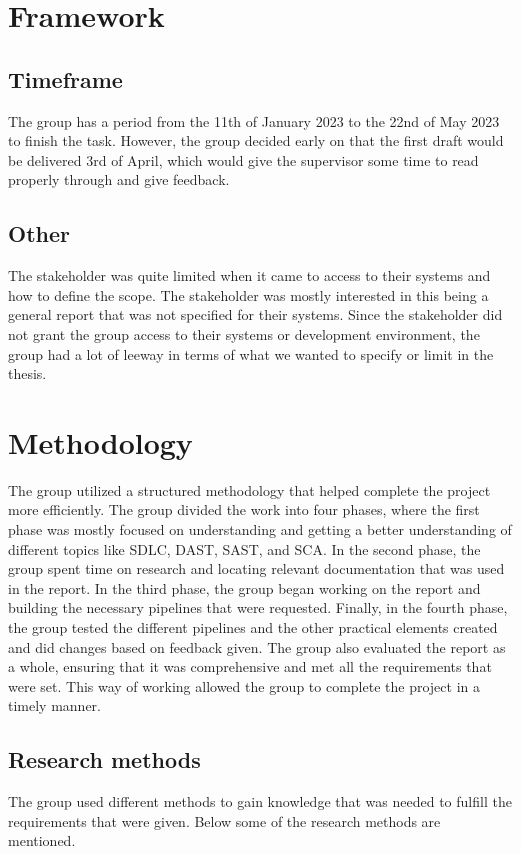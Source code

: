 \section{Framework}

\subsection{Timeframe}
The group has a period from the 11th of January 2023 to the 22nd of May 2023 to finish the task. However, the group decided early on that the first draft would be delivered 3rd of April, which would give the supervisor some time to read properly through and give feedback. 

\subsection{Other}
The stakeholder was quite limited when it came to access to their systems and how to define the scope. The stakeholder was mostly interested in this being a general report that was not specified for their systems. Since the stakeholder did not grant the group access to their systems or development environment, the group had a lot of leeway in terms of what we wanted to specify or limit in the thesis. 


\section{Methodology}
The group utilized a structured methodology that helped complete the project more efficiently. The group divided the work into four phases, where the first phase was mostly focused on understanding and getting a better understanding of different topics like SDLC, DAST, SAST, and SCA. In the second phase, the group spent time on research and locating relevant documentation that was used in the report. In the third phase, the group began working on the report and building the necessary pipelines that were requested. Finally, in the fourth phase, the group tested the different pipelines and the other practical elements created and did changes based on feedback given. The group also evaluated the report as a whole, ensuring that it was comprehensive and met all the requirements that were set. This way of working allowed the group to complete the project in a timely manner. 

\subsection{Research methods}
The group used different methods to gain knowledge that was needed to fulfill the requirements that were given. Below some of the research methods are mentioned. 

